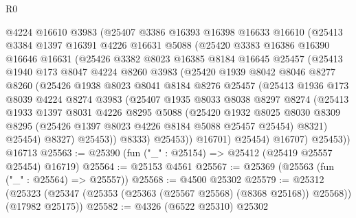 \begin{lexlean}{R0}
\begin{coremodule}
        @4224
        @16610
        @3983
        (@25407
          @3386
          @16393
          @16398
          @16633
          @16610
          (@25413
            @3384
            @1397
            @16391
            @4226
            @16631
            @5088
            (@25420
              @3383
              @16386
              @16390
              @16646
              @16631
              (@25426
                @3382
                @8023
                @16385
                @8184
                @16645
                @25457
                (@25413
                  @1940
                  @173
                  @8047
                  @4224
                  @8260
                  @3983
                  (@25420
                    @1939
                    @8042
                    @8046
                    @8277
                    @8260
                    (@25426
                      @1938
                      @8023
                      @8041
                      @8184
                      @8276
                      @25457
                      (@25413
                        @1936
                        @173
                        @8039
                        @4224
                        @8274
                        @3983
                        (@25407
                          @1935
                          @8033
                          @8038
                          @8297
                          @8274
                          (@25413
                            @1933
                            @1397
                            @8031
                            @4226
                            @8295
                            @5088
                            (@25420
                              @1932
                              @8025
                              @8030
                              @8309
                              @8295
                              (@25426 @1397 @8023 @4226 @8184 @5088 @25457 @25454)
                              @8321)
                            @25454)
                          @8327)
                        @25453))
                    @8333)
                  @25453))
              @16701)
            @25454)
          @16707)
        @25453))
    @16713
@25563 := @25390 (fun ("_" : @25154) => @25412 (@25419 @25557 @25454) @16719)
@25564 := @25153 @4561
@25567 := @25369 (@25563 (fun ("_" : @25564) => @25557))
@25568 := @4500 @25302
@25579 := @25312
    (@25323 (@25347 (@25353 (@25363 (@25567 @25568) (@8368 @25168)) @25568)) (@17982 @25175))
@25582 := @4326 (@6522 @25310) @25302

\end{coremodule}
\end{lexlean}
